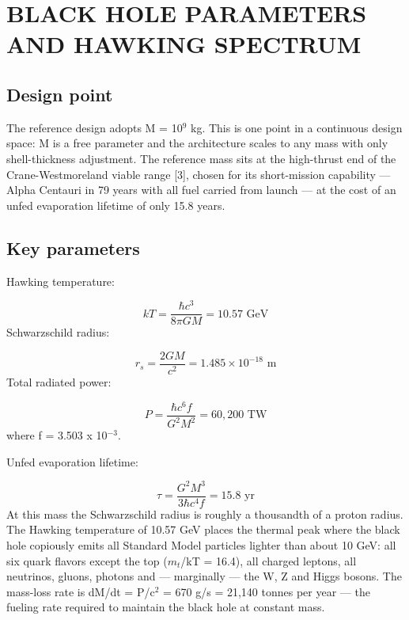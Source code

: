 \documentclass[12pt,a4paper]{article}
\begin{document}
\section{BLACK HOLE PARAMETERS AND HAWKING SPECTRUM}
\subsection{Design point}
The reference design adopts M = 10$^{9}$ kg. This is one point in a continuous design space: M is a free parameter and the architecture scales to any mass with only shell-thickness adjustment. The reference mass sits at the high-thrust end of the Crane-Westmoreland viable range [3], chosen for its short-mission capability --- Alpha Centauri in 79 years with all fuel carried from launch --- at the cost of an unfed evaporation lifetime of only 15.8 years.

\subsection{Key parameters}
Hawking temperature:

\begin{equation}
kT = \frac{\hbar c^3}{8\pi G M} = 10.57 \text{ GeV}
\end{equation}
Schwarzschild radius:

\begin{equation}
r_s = \frac{2GM}{c^2} = 1.485 \times 10^{-18} \text{ m}
\end{equation}
Total radiated power:

\begin{equation}
P = \frac{\hbar c^6 f}{G^2 M^2} = 60{,}200 \text{ TW}
\end{equation}
where f = 3.503 x 10$^{-3}$.

Unfed evaporation lifetime:

\begin{equation}
\tau = \frac{G^2 M^3}{3\hbar c^4 f} = 15.8 \text{ yr}
\end{equation}
At this mass the Schwarzschild radius is roughly a thousandth of a proton radius. The Hawking temperature of 10.57 GeV places the thermal peak where the black hole copiously emits all Standard Model particles lighter than about 10 GeV: all six quark flavors except the top ($m_t$/kT = 16.4), all charged leptons, all neutrinos, gluons, photons and --- marginally --- the W, Z and Higgs bosons. The mass-loss rate is dM/dt = P/c$^{2}$ = 670 g/s = 21,140 tonnes per year --- the fueling rate required to maintain the black hole at constant mass.
\end{document}
